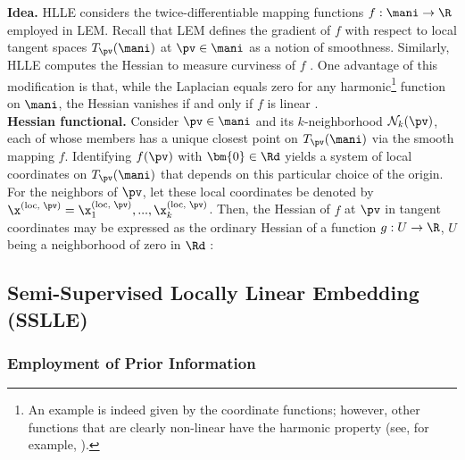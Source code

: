 \textbf{Idea.}
HLLE considers the twice-differentiable mapping functions 
$f: \mani \rightarrow \R$ employed in LEM.
Recall that LEM defines the gradient of $f$ with respect to local tangent 
spaces $T_{\pv}(\mani)$ at $\pv \in \mani$ as a notion of smoothness.
Similarly, HLLE computes the Hessian to measure curviness of $f$ 
\citep{donohogrimes2003}.
One advantage of this modification is that, while the Laplacian equals zero 
for any harmonic\footnote{
An example is indeed given by the coordinate functions; however, other functions 
that are clearly non-linear have the harmonic property (see, for example,
\citet{axleretal2001}).
} function on $\mani$, the Hessian vanishes if and only if $f$ is 
linear \citep{dissross2008}.
\\

\textbf{Hessian functional.}
Consider $\pv \in \mani$ and its $k$-neighborhood $\mathcal{N}_k(\pv)$, each of 
whose members has a unique closest point on $T_{\pv}(\mani)$ via the smooth 
mapping $f$.
Identifying $f(\pv)$ with $\bm{0} \in \Rd$ yields a system of local 
coordinates on $T_{\pv}(\mani)$ that depends on this particular choice of the 
origin.
For the neighbors of $\pv$, let these local coordinates be denoted by 
$\x^{(\text{loc, }\pv)} = \x_1^{(\text{loc, }\pv)}, ..., 
\x_k^{(\text{loc, }\pv)}$.
Then, the Hessian of $f$ at $\pv$ in tangent coordinates may be expressed as the 
ordinary Hessian of a function $g: U \rightarrow \R$, $U$ being a neighborhood 
of zero in $\Rd$ \citep{donohogrimes2003}:



\subsection{Semi-Supervised Locally Linear Embedding (SSLLE)}
\label{sslle}


\subsubsection{Employment of Prior Information}
\label{prior-info}

